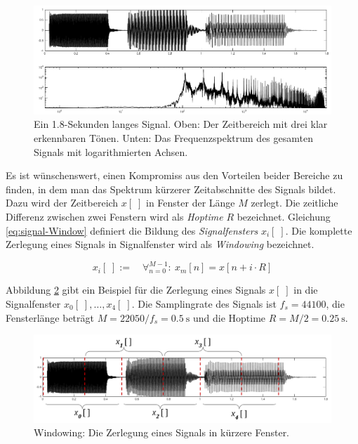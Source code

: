 \begin{figure}[h]
	\centering
	\includegraphics[width=1\textwidth]{bilder/stft01.png}
	\caption[Beispiel für die DFT]{Ein 1.8-Sekunden langes Signal. Oben: Der Zeitbereich mit drei klar erkennbaren Tönen. Unten: Das Frequenzspektrum des gesamten Signals mit logarithmierten Achsen.}
	\label{img:stft01}
\end{figure}

Es ist wünschenswert, einen Kompromiss aus den Vorteilen beider Bereiche zu finden, in dem man das Spektrum kürzerer Zeitabschnitte des Signals bildet. Dazu wird der Zeitbereich $x[\;]$ in Fenster der Länge $M$ zerlegt. Die zeitliche Differenz zwischen zwei Fenstern wird als \emph{Hoptime} $R$ bezeichnet. Gleichung \ref{eq:signal-Window} definiert die Bildung des \emph{Signalfensters} $x_i[\;]$. Die komplette Zerlegung eines Signals in Signalfenster wird als \emph{Windowing} bezeichnet.\cite{juliusSmith}

\begin{equation}
x_i[\;] := \quad \mathop{\forall}_{n = 0}^{M-1} :\ x_{m}[n] = x[n+i\cdot R]
\label{eq:signal-Window}
\end{equation}

Abbildung \ref{img:siganlWindows} gibt ein Beispiel für die Zerlegung eines Signals $x[\;]$ in die Signalfenster $x_0[\;] ,\ldots, x_4[\;]$. Die Samplingrate des Signals ist $f_s = 44100$, die Fensterlänge beträgt $M = 22050 / f_s = \SI{0.5}{\second}$ und die Hoptime $R = M / 2= \SI{0.25}{\second}$.

\begin{figure}[h]
	\centering
	\includegraphics[width=1\textwidth]{bilder/signalWindows02.png}
	\caption{Windowing: Die Zerlegung eines Signals in kürzere Fenster.}
	\label{img:siganlWindows}
\end{figure}

